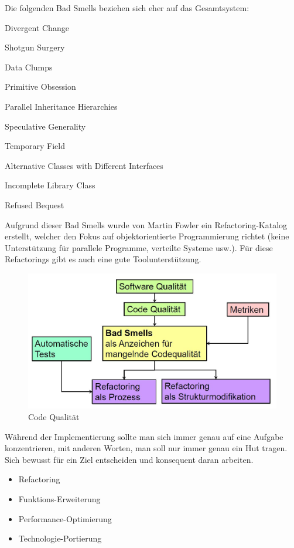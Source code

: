 Die folgenden Bad Smells beziehen sich eher auf das Gesamtsystem:
\begin{multicols}{2}
\begin{description}
	\item Divergent Change
	\item Shotgun Surgery
	\item Data Clumps
	\item Primitive Obsession
	\item Parallel Inheritance Hierarchies
	\item Speculative Generality
	\item Temporary Field
	\item Alternative Classes with Different Interfaces
	\item Incomplete Library Class
	\item Refused Bequest
\end{description}
\end{multicols}
Aufgrund dieser Bad Smells wurde von Martin Fowler ein Refactoring-Katalog erstellt, welcher den Fokus auf objektorientierte Programmierung richtet (keine Unterstützung für parallele Programme, verteilte Systeme usw.). Für diese Refactorings gibt es auch eine gute Toolunterstützung. 

\begin{figure}
	\centering
	\includegraphics[width=0.7\linewidth]{fig/fazit-refactoring}
	\caption{Code Qualität}
	\label{fig:fazit-refactoring}
\end{figure}

Während der Implementierung sollte man sich immer genau auf eine Aufgabe konzentrieren, mit anderen Worten, man soll nur immer genau ein Hut tragen. Sich bewusst für ein Ziel entscheiden und konsequent daran arbeiten.

\begin{itemize}
	\item Refactoring
	\item Funktions-Erweiterung
	\item Performance-Optimierung
	\item Technologie-Portierung
\end{itemize}

